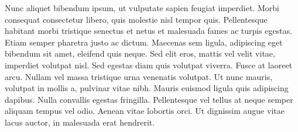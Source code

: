 Nunc aliquet bibendum ipsum, ut vulputate sapien feugiat imperdiet. Morbi consequat consectetur libero, quis molestie nisl tempor quis. Pellentesque habitant morbi tristique senectus et netus et malesuada fames ac turpis egestas. Etiam semper pharetra justo ac dictum. Maecenas sem ligula, adipiscing eget bibendum sit amet, eleifend quis neque. Sed elit eros, mattis vel velit vitae, imperdiet volutpat nisl. Sed egestas diam quis volutpat viverra. Fusce at laoreet arcu. Nullam vel massa tristique urna venenatis volutpat. Ut nunc mauris, volutpat in mollis a, pulvinar vitae nibh. Mauris euismod ligula quis adipiscing dapibus. Nulla convallis egestas fringilla. Pellentesque vel tellus at neque semper aliquam tempus vel odio. Aenean vitae lobortis orci. Ut dignissim augue vitae lacus auctor, in malesuada erat hendrerit.